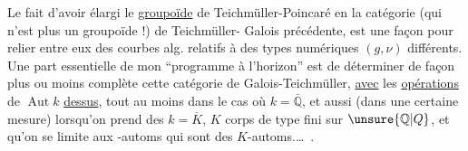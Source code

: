 Le fait d'avoir élargi le \uline{groupoïde} de
Teichmüller-Poincaré en la catégorie (qui n'est
plus un groupoïde !) de Teichmüller-
Galois précédente, est une façon  
pour relier entre eux des courbes alg. relatifs
à des types numériques $(g,\nu)$ différents.
Une part essentielle de mon ``programme
à l'horizon'' est de déterminer de façon
plus ou moins complète cette catégorie
de Galois-Teichmüller,  \uline{avec} les \uline{opérations}
de $\operatorname{Aut}k$ \uline{dessus}, tout au moins dans
le cas où $k=\overline{\mathbb Q}$, et aussi (dans une
certaine mesure) lorsqu'on prend des
$k=\overline K$, $K$ corps de type fini sur $\unsure{\mathbb Q|Q}$, et
qu'on se limite aux -automs  qui
sont des $K$-automs.\ldots\ .
